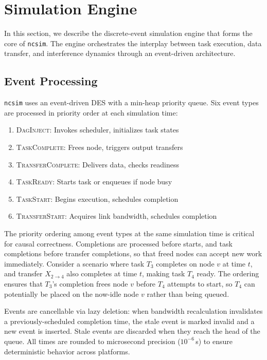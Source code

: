 \documentclass[conference]{IEEEtran}
\newcommand{\ncsim}{\texttt{ncsim}}
\begin{document}
\section{Simulation Engine}
\label{sec:engine}

In this section, we describe the discrete-event simulation engine that
forms the core of \ncsim{}.  The engine orchestrates the interplay between
task execution, data transfer, and interference dynamics through an
event-driven architecture.

\subsection{Event Processing}

\ncsim{} uses an event-driven DES with a min-heap priority queue.  Six event
types are processed in priority order at each simulation time:

\begin{enumerate}[itemsep=1pt,leftmargin=*]
\item \textsc{DagInject}: Invokes scheduler, initializes task states
\item \textsc{TaskComplete}: Frees node, triggers output transfers
\item \textsc{TransferComplete}: Delivers data, checks readiness
\item \textsc{TaskReady}: Starts task or enqueues if node busy
\item \textsc{TaskStart}: Begins execution, schedules completion
\item \textsc{TransferStart}: Acquires link bandwidth, schedules completion
\end{enumerate}

The priority ordering among event types at the same simulation time is
critical for causal correctness.  Completions are processed before starts,
and task completions before transfer completions, so that freed nodes can
accept new work immediately.  Consider a scenario where task $T_3$ completes
on node $v$ at time $t$, and transfer $X_{2 \to 4}$ also completes at time
$t$, making task $T_4$ ready.  The ordering ensures that $T_3$'s completion
frees node $v$ before $T_4$ attempts to start, so $T_4$ can potentially be
placed on the now-idle node $v$ rather than being queued.

Events are cancellable via lazy deletion: when bandwidth recalculation
invalidates a previously-scheduled completion time, the stale event is
marked invalid and a new event is inserted.  Stale events are discarded
when they reach the head of the queue.  All times are rounded to
microsecond precision ($10^{-6}$\,s) to ensure deterministic behavior
across platforms.
\end{document}
